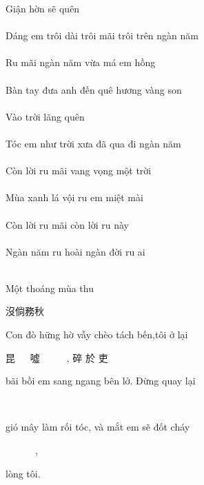 \documentclass[14pt,a4paper]{extarticle}
\begin{document}
Giận hờn sẽ quên \\[1ex]
{\Huge {}  }\\[1ex]
Dáng em trôi dài trôi mãi trôi trên ngàn năm \\[1ex]
{\Huge {}\em{}  }\\[1ex]
Ru mãi ngàn năm vừa má em hồng \\[1ex]
{\Huge \ru{}\em{}  }\\[1ex]
Bàn tay đưa anh đến quê hương vàng son \\[1ex]
{\Huge {}\ANh{}\son }\\[1ex]
Vào trời lãng quên \\[1ex]
{\Huge {}  }\\[1ex]
Tóc em như trời xưa đã qua đi ngàn năm \\[1ex]
{\Huge {}\em{}\qua{}  }\\[1ex]
Còn lời ru mãi vang vọng một trời \\[1ex]
{\Huge {}\ru{}\vang{}  }\\[1ex]
Mùa xanh lá vội ru em miệt mài \\[1ex]
{\Huge {}\xanh{}\ru\em{}  }\\[1ex]
Còn lời ru mãi còn lời ru này \\[1ex]
{\Huge {}\ru{}\ru{}  }\\[1ex]
Ngàn năm ru hoài ngàn đời ru ai\\[1ex]
{\Huge {}\ru{}\ru\ai }\\[1ex]

\newpage \Huge 


{\small Một thoáng mùa thu}

沒倘務秋\vspace*{2cm}




{\small Con đò hững hờ vẫy chèo tách bến,\hfill  tôi ở lại}

昆 𦪂 𠾿 噓 𢭶 𣛨 𠝖 𡍣 , 碎 於 吏 

{\small bãi bồi em sang ngang bên lở. \hfill Đừng quay lại}

𡓁 培  㛪 𨖅  昂   邊 𡋿 。仃 歪 吏 

{\small gió mây làm rối tóc, \hfill và mắt em sẽ đốt cháy}

𩙋 𩘄 爫 𩯀 𦆹 , 吧 眜 㛪 𠱊 炪 𤈜 

{\small  lòng tôi.}
 
\end{document}
